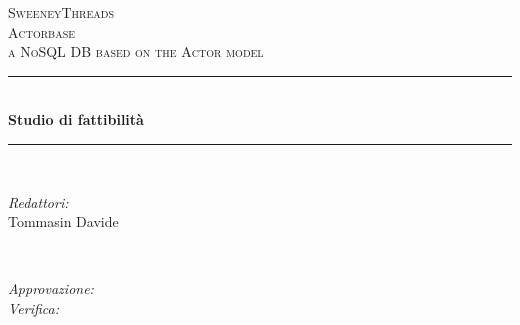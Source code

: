 \documentclass[a4paper]{article}
\begin{document}
	
	\begin{titlepage}
		\newcommand{\HRule}{\rule{\linewidth}{0.5mm}} 
		\center  
		
		\textsc{\LARGE SweeneyThreads}\\[1.5cm] 
		\textsc{\Large Actorbase}\\[0.5cm] 
		\textsc{\large a NoSQL DB based on the Actor model}\\[0.5cm]
		
		
		\HRule \\[0.4cm]
		{ \huge \bfseries Studio di fattibilità}\\[0.4cm] 
		\HRule \\[1.5cm]
		
		\begin{minipage}{0.4\textwidth}
			\begin{flushleft} \large
				\emph{Redattori:}\\
				Tommasin Davide\\
			\end{flushleft}
		\end{minipage}
		~
		\begin{minipage}{0.4\textwidth}
			\begin{flushright} \large
				\emph{Approvazione:} \\
				\emph{Verifica:} \\
			\end{flushright}
		\end{minipage}
		

\end{titlepage}
\end{document}
